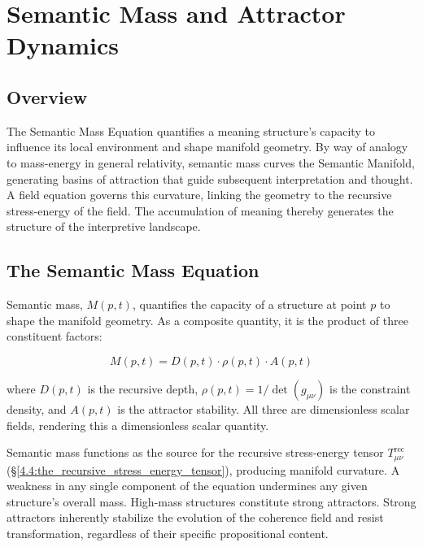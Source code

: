 \chapter{Semantic Mass and Attractor Dynamics}
\label{5:semantic_mass_and_attractor_dynamics}


\section{Overview}
\label{5.1:overview}

The Semantic Mass Equation quantifies a meaning structure's capacity to influence its local environment and shape manifold geometry. By way of analogy to mass-energy in general relativity, semantic mass curves the Semantic Manifold, generating basins of attraction that guide subsequent interpretation and thought. A field equation governs this curvature, linking the geometry to the recursive stress-energy of the field. The accumulation of meaning thereby generates the structure of the interpretive landscape.


\section{The Semantic Mass Equation}
\label{5.2:the_semantic_mass_equation}

Semantic mass, \(M(p,t)\), quantifies the capacity of a structure at point \(p\) to shape the manifold geometry. As a composite quantity, it is the product of three constituent factors:

\begin{equation}
M(p, t) = D(p, t) \cdot \rho(p, t) \cdot A(p, t)
\end{equation}

where \(D(p, t)\) is the recursive depth, \(\rho(p, t) = 1/\det(g_{\mu\nu})\) is the constraint density, and \(A(p, t)\) is the attractor stability. All three are dimensionless scalar fields, rendering this a dimensionless scalar quantity. 

Semantic mass functions as the source for the recursive stress-energy tensor \(T^{\text{rec}}_{\mu\nu}\) (\S\ref{4.4:the_recursive_stress_energy_tensor}), producing manifold curvature. A weakness in any single component of the equation undermines any given structure's overall mass. High-mass structures constitute strong attractors. Strong attractors inherently stabilize the evolution of the coherence field and resist transformation, regardless of their specific propositional content.

